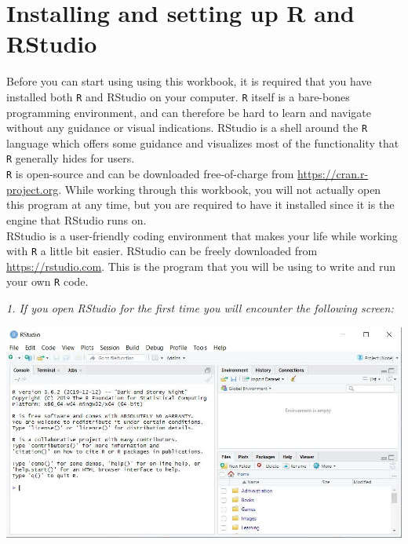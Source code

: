 \thispagestyle{emptyhead}

\section{Installing and setting up R and RStudio}

Before you can start using using this workbook, it is required that you have installed both \texttt{R} and RStudio on your computer. \texttt{R} itself is a bare-bones programming environment, and can therefore be hard to learn and navigate without any guidance or visual indications. RStudio is a shell around the \texttt{R} language which offers some guidance and visualizes most of the functionality that \texttt{R} generally hides for users.\\

\texttt{R} is open-source and can be downloaded free-of-charge from \url{https://cran.r-project.org}. While working through this workbook, you will not actually open this program at any time, but you are required to have it installed since it is the engine that RStudio runs on. \\

RStudio is a user-friendly coding environment that makes your life while working with \texttt{R} a little bit easier. RStudio can be freely downloaded from \url{https://rstudio.com}. This is the program that you will be using to write and run your own \texttt{R} code. \\

\vspace*{1cm}

\begin{minipage}{0.4\textwidth}
\textit{1. If you open RStudio for the first
time you will encounter the
following screen:}
\end{minipage}%
\hfill%
\begin{minipage}{0.55\textwidth}
\includegraphics[width=\linewidth]{Files/Images/setup1.jpg}
\end{minipage} \\
\\
\bigskip

